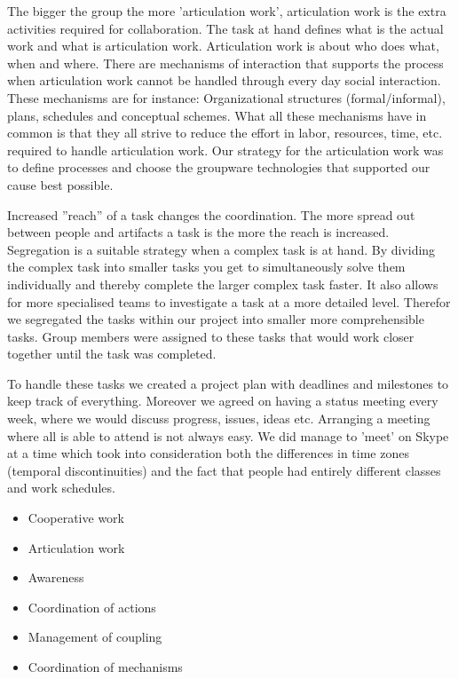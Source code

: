 The bigger the group the more 'articulation work', articulation work is the extra activities required for collaboration. The task at hand defines what is the actual work and what is articulation work. Articulation work is about who does what, when and where. There are mechanisms of interaction that supports the process when articulation work cannot be handled through every day social interaction. These mechanisms are for instance: Organizational structures (formal/informal), plans, schedules and conceptual schemes. What all these mechanisms have in common is that they all strive to reduce the effort in labor, resources, time, etc. required to handle articulation work. 
Our strategy for the articulation work was to define processes and choose the groupware technologies that supported our cause best possible. 

Increased ''reach'' of a task changes the coordination. The more spread out between people and artifacts a task is the more the reach is increased. Segregation is a suitable strategy when a complex task is at hand. By dividing the complex task into smaller tasks you get to simultaneously solve them individually and thereby complete the larger complex task faster. It also allows for more specialised teams to investigate a task at a more detailed level. Therefor we segregated the tasks within our project into smaller more comprehensible tasks. Group members were assigned to these tasks that would work closer together until the task was completed. 

To handle these tasks we created a project plan with deadlines and milestones to keep track of everything. Moreover we agreed on having a status meeting every week, where we would discuss progress, issues, ideas etc. Arranging a meeting where all is able to attend is not always easy. We did manage to 'meet' on Skype at a time which took into consideration both the differences in time zones (temporal discontinuities) and the fact that people had entirely different classes and work schedules.


\begin{itemize}
  \item Cooperative work
  \item Articulation work
  \item Awareness
	\item Coordination of actions
	\item Management of coupling
	\item Coordination of mechanisms
\end{itemize}


